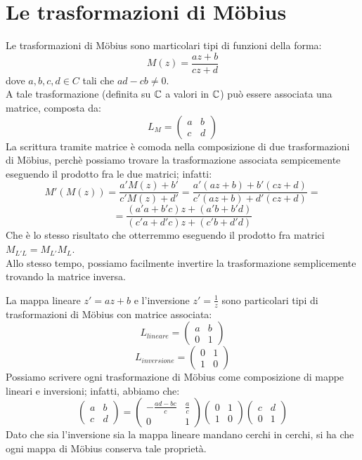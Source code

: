\chapter{Le trasformazioni di M\"{o}bius}

Le trasformazioni di M\"{o}bius sono marticolari tipi di funzioni della forma:
\begin{equation}
M(z)=\frac{az+b}{cz+d}
\end{equation}
dove $a,b,c,d\in C$ tali che $ad-cb \neq 0$.
\\A tale trasformazione (definita su $\mathbb{C}$ a valori in $\mathbb{C}$) può essere associata una matrice, composta da:
\[
L_M =
\begin{pmatrix}
a	&b\\
c	&d
\end{pmatrix}
\]                                  
La scrittura tramite matrice è comoda nella composizione di due trasformazioni di M\"{o}bius, perchè possiamo trovare la trasformazione associata sempicemente eseguendo il prodotto fra le due matrici; infatti:
$$M'(M(z))=\frac{a'M(z) + b'}{c'M(z) + d'}=\frac{a'(az+b)+b'(cz+d)}{c'(az+b)+d'(cz+d)}=$$
$$=\frac{(a'a+b'c)z+(a'b+b'd)}{(c'a+d'c)z+(c'b+d'd)}$$
Che è lo stesso risultato che otterremmo eseguendo il prodotto fra matrici $M_{L'L}=M_{L'}M_L$.
\\Allo stesso tempo, possiamo facilmente invertire la trasformazione semplicemente trovando la matrice inversa.
 
La mappa lineare $z'=az+b$ e l'inversione $z'=\frac{1}{z}$ sono particolari tipi di trasformazioni di M\"{o}bius con matrice associata:
\[
L_{lineare} =
\begin{pmatrix}
a	&b\\
0	&1
\end{pmatrix}
\]
\[
L_{inversione} =
\begin{pmatrix}
0	&1\\
1	&0
\end{pmatrix}
\]
Possiamo scrivere ogni trasformazione di M\"{o}bius come composizione di mappe lineari e inversioni; infatti, abbiamo che:
\[
\begin{pmatrix}a&b\\c&d\end{pmatrix} = \begin{pmatrix}-\frac{ad-bc}{c}&\frac{a}{c}\\0&1\end{pmatrix}\begin{pmatrix}0&1\\1&0\end{pmatrix}\begin{pmatrix}c&d\\0&1\end{pmatrix}
\]
Dato che sia l'inversione sia la mappa lineare mandano cerchi in cerchi, si ha che ogni mappa di M\"{o}bius conserva tale proprietà.

